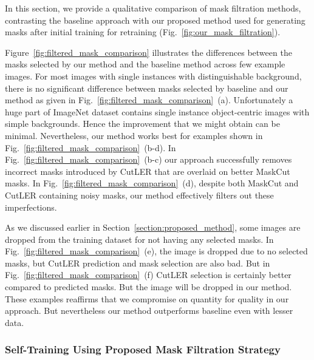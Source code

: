 In this section, we provide a qualitative comparison of mask filtration methods, contrasting the baseline approach with our proposed method used for generating masks after initial training for retraining (Fig.~\ref{fig:our_mask_filtration}).

Figure~\ref{fig:filtered_mask_comparison} illustrates the differences between the masks selected by our method and the baseline method across few example images. For most images with single instances with distinguishable background, there is no significant difference between masks selected by baseline and our method as given in Fig.~\ref{fig:filtered_mask_comparison}~(a). Unfortunately a huge part of ImageNet dataset contains single instance object-centric images with simple backgrounds. Hence the improvement that we might obtain can be minimal. Nevertheless, our method works best for examples shown in Fig.~\ref{fig:filtered_mask_comparison}~(b-d). In Fig.~\ref{fig:filtered_mask_comparison}~(b-c) our approach successfully removes incorrect masks introduced by CutLER that are overlaid on better MaskCut masks. In Fig.~\ref{fig:filtered_mask_comparison}~(d), despite both MaskCut and CutLER containing noisy masks, our method effectively filters out these imperfections.

As we discussed earlier in Section~\ref{section:proposed_method}, some images are dropped from the training dataset for not having any selected masks. In Fig.~\ref{fig:filtered_mask_comparison}~(e), the image is dropped due to no selected masks, but CutLER prediction and mask selection are also bad. But in Fig.~\ref{fig:filtered_mask_comparison}~(f) CutLER selection is certainly better compared to predicted masks. But the image will be dropped in our method. These examples reaffirms that we compromise on quantity for quality in our approach. But nevertheless our method outperforms baseline even with lesser data.

\subsubsection{Self-Training Using Proposed Mask Filtration Strategy}

